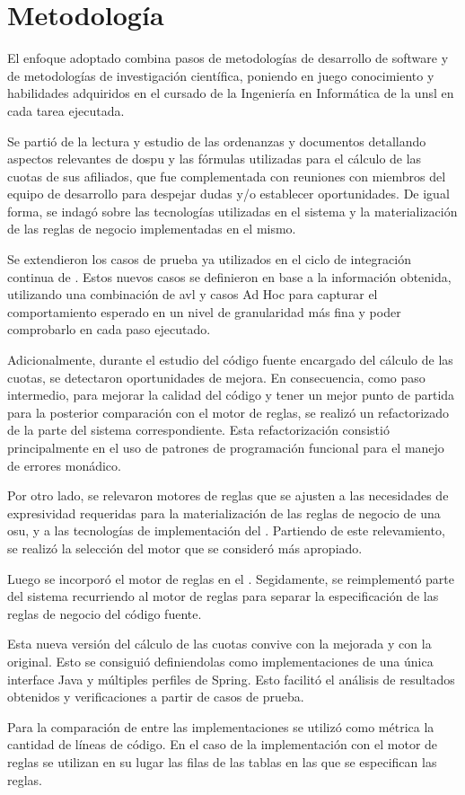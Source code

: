 \section{Metodología} \label{sec:metodologia}

El enfoque adoptado combina pasos de metodologías de desarrollo de software y de metodologías de investigación científica, poniendo en juego conocimiento y habilidades adquiridos en el cursado de la Ingeniería en Informática de la \acrshort{unsl} en cada tarea ejecutada.

Se partió de la lectura y estudio de las ordenanzas y documentos detallando aspectos relevantes de \acrshort{dospu} y las fórmulas utilizadas para el cálculo de las cuotas de sus afiliados, que fue complementada con reuniones con miembros del equipo de desarrollo {\SIDOSPU} para despejar dudas y/o establecer oportunidades. 
De igual forma, se indagó sobre las tecnologías utilizadas en el sistema y la materialización de las reglas de negocio implementadas en el mismo.

Se extendieron los casos de prueba ya utilizados en el ciclo de integración continua de {\SIDOSPU}.
Estos nuevos casos se definieron en base a la información obtenida, utilizando una combinación de \acrfull{avl} y casos Ad Hoc para capturar el comportamiento esperado en un nivel de granularidad más fina y poder comprobarlo en cada paso ejecutado.

Adicionalmente, durante el estudio del código fuente encargado del cálculo de las cuotas, se detectaron oportunidades de mejora. 
En consecuencia, como paso intermedio, para mejorar la calidad del código y tener un mejor punto de partida para la posterior comparación con el motor de reglas, se realizó un refactorizado de la parte del sistema correspondiente. 
Esta refactorización consistió principalmente en el uso de patrones de programación funcional para el manejo de errores monádico.

Por otro lado, se relevaron motores de reglas que se ajusten a las necesidades de expresividad requeridas para la materialización de las reglas de negocio de una \acrshort{osu}, y a las tecnologías de implementación del {\SIDOSPU}. 
Partiendo de este relevamiento, se realizó la selección del motor que se consideró más apropiado.

Luego se incorporó el motor de reglas en el {\SIDOSPU}. 
Segidamente, se reimplementó parte del sistema recurriendo al motor de reglas para separar la especificación de las reglas de negocio del código fuente.

Esta nueva versión del cálculo de las cuotas convive con la mejorada y con la original. 
Esto se consiguió definiendolas como implementaciones de una única interface Java y múltiples perfiles de Spring. 
Esto facilitó el análisis de resultados obtenidos y verificaciones a partir de casos de prueba. 

Para la comparación de entre las implementaciones se utilizó como métrica la cantidad de líneas de código.  
En el caso de la implementación con el motor de reglas se utilizan en su lugar las filas de las tablas en las que se especifican las reglas.
